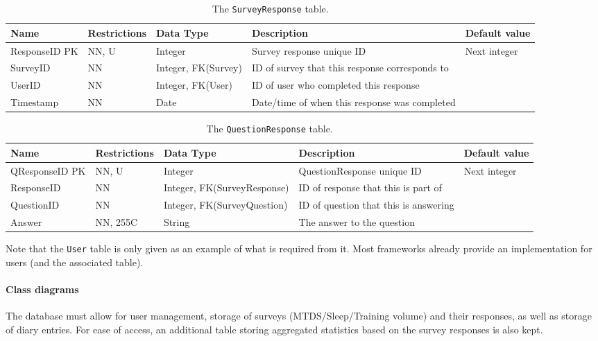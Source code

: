 \documentclass[a4paper, 11pt, titlepage]{article}
\begin{document}
\begin{table}[H]
  \centering
  \caption{The \texttt{SurveyResponse} table.}
    \begin{tabularx}{\textwidth}{llp{2.5cm}Xl}
    \hline
    Name  & Restrictions & Data Type & Description & Default value \\
    \hline
    ResponseID PK & NN, U & Integer & Survey response unique ID & Next integer \\
    SurveyID & NN    & Integer, FK(Survey) & ID of survey that this response corresponds to &  \\
    UserID & NN    & Integer, FK(User) & ID of user who completed this response &  \\
    Timestamp & NN    & Date  & Date/time of when this response was completed &  \\
    \hline
    \end{tabularx}%
  \label{tab:dd:SurveyResponse}%
\end{table}%


\begin{table}[H]
  \centering
  \caption{The \texttt{QuestionResponse} table.}
    \begin{tabularx}{\textwidth}{llp{3.3cm}Xl}
    \hline
    Name  & Restrictions & Data Type & Description & Default value \\
    \hline
    QResponseID PK & NN, U & Integer & QuestionResponse unique ID & Next integer \\
    ResponseID & NN    & Integer, FK(SurveyResponse) & ID of response that this is part of &  \\
    QuestionID & NN    & Integer, FK(SurveyQuestion) & ID of question that this is answering &  \\
    Answer & NN, 255C & String & The answer to the question &  \\
    \hline
    \end{tabularx}%
  \label{tab:dd:QuestionResponse}%
\end{table}%

Note that the \texttt{User} table is only given as an example of what is required from it. Most frameworks already provide an implementation for users (and the associated table). 

\paragraph{Class diagrams}
The database must allow for user management, storage of surveys (MTDS/Sleep/Training volume) and their responses, as well as storage of diary entries. For ease of access, an additional table storing aggregated statistics based on the survey responses is also kept.
\end{document}
